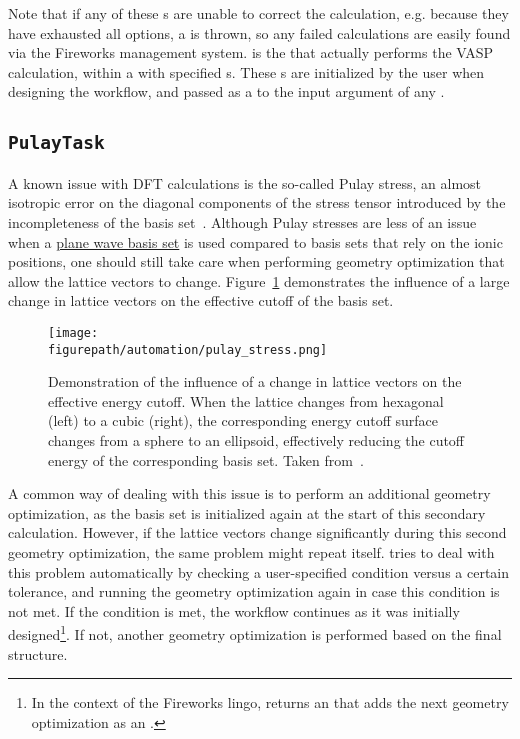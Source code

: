 \begin{refsection}
\begin{itemize}
\end{itemize} 
 
Note that if any of these s are unable to correct the 
calculation, e.g. because they have exhausted all options, a 
 is thrown, so any failed calculations are easily 
found via the Fireworks management system.  is the 
 that actually performs the \gls{VASP} calculation, within a 
 with specified s. These 
s are initialized by the user when designing the workflow, 
and passed as a  to the  input argument of any 
. 
 
\subsection{\texttt{PulayTask}} \label{automation:sec-PulayTask} 
 
A known issue with \gls{DFT} calculations is the so-called Pulay stress, an almost 
isotropic error on the diagonal components of the stress tensor introduced by 
the incompleteness of the basis set~\cite{Francis1990}. Although Pulay 
stresses are less of an issue when a \hyperref[dft:sec-basis_set]{plane wave 
basis set} is used compared to basis sets that rely on the ionic positions, 
one should still take care when performing geometry optimization that allow 
the lattice vectors to change. Figure~\ref{automation:fig-pulay} demonstrates 
the influence of a large change in lattice vectors on the effective cutoff of 
the basis set.  
 
\begin{figure} 
\centering 
\texttt{[image: \\figurepath/automation/pulay\_stress.png]} 
\caption{Demonstration of the influence of a change in lattice vectors on the 
effective energy cutoff. When the lattice changes from hexagonal (left) to a 
cubic (right), the corresponding energy cutoff surface changes from a sphere 
to an ellipsoid, effectively reducing the cutoff energy of the corresponding 
basis set. Taken from~\cite{Pulay}.} 
\label{automation:fig-pulay} 
\end{figure} 
 
A common way of dealing with this issue is to perform an additional geometry 
optimization, as the basis set is initialized again at the start of this 
secondary calculation. However, if the lattice vectors change significantly 
during this second geometry optimization, the same problem might repeat 
itself.  tries to deal with this problem automatically by 
checking a user-specified condition versus a certain tolerance, and running 
the geometry optimization again in case this condition is not met. If the 
condition is met, the workflow continues as it was initially 
designed\footnote{In the context of the Fireworks lingo,  
returns an  that adds the next geometry optimization as an 
.}. If not, another geometry optimization is performed based on 
the final structure. 
 

\end{refsection}
